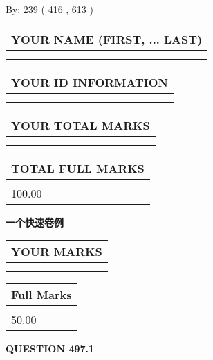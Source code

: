 \documentclass{ctexart}
\begin{document}
   
\hspace{1.0in} By: 
 239 ( 416 ,  613 )
   
   
   
   
\newpage 
\setcounter{page}{ 
   497001 } 
   
   
   
   
\noindent\begin{tabular}{|l|}
\hline
YOUR NAME (FIRST, ... LAST)  \\
\hline
 \\ 
 \\ 
\hline
\end{tabular}
\hspace{0.05in} \begin{tabular}{|l|}
\hline
 YOUR   ID   INFORMATION  \\
\hline
 \\ 
 \\ 
\hline
\end{tabular}
   
   
\vspace{0.2in}\noindent\begin{tabular}{|l|}
\hline
YOUR TOTAL MARKS  \\
\hline
 \\ 
 \\ 
\hline
\end{tabular}
\hspace{0.05in} \begin{tabular}{|l|}
\hline
TOTAL FULL MARKS  \\
\hline
 \\ 
100.00 \\
\hline
\end{tabular}
   
   
 \vspace{0.2in}
{\LARGE {\textbf{ 一个快速卷例}}}
   
   
  
\vspace{0.2in}
  
\noindent\begin{tabular}{|l|}
\hline
 YOUR MARKS  \\
\hline
 \\ 
 \\ 
\hline
\end{tabular}
\hspace{0.05in} \begin{tabular}{|l|}
\hline
 Full Marks  \\
\hline
 \\ 
50.00 \\
\hline
\end{tabular}
{\textbf{\Large{QUESTION
497.1 
}}}
  
\end{document}
